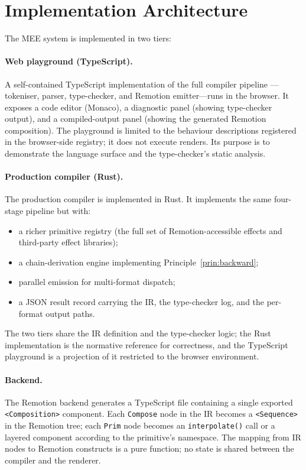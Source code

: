 \documentclass[twocolumn,11pt,a4paper]{article}
\theoremstyle{mee}
\theoremstyle{definition}
\theoremstyle{remark}
\begin{document}
\section{Implementation Architecture}
\label{sec:impl}

The MEE system is implemented in two tiers:

\paragraph{Web playground (TypeScript).}
A self-contained TypeScript implementation of the full compiler pipeline
---tokeniser, parser, type-checker, and Remotion emitter---runs in the
browser. It exposes a code editor (Monaco), a diagnostic panel (showing
type-checker output), and a compiled-output panel (showing the generated
Remotion composition). The playground is limited to the behaviour
descriptions registered in the browser-side registry; it does not execute
renders. Its purpose is to demonstrate the language surface and the
type-checker's static analysis.

\paragraph{Production compiler (Rust).}
The production compiler is implemented in Rust. It implements the same
four-stage pipeline but with:
\begin{itemize}[leftmargin=1.4em,itemsep=1pt]
\item a richer primitive registry (the full set of Remotion-accessible
  effects and third-party effect libraries);
\item a chain-derivation engine implementing
  Principle~\ref{prin:backward};
\item parallel emission for multi-format dispatch;
\item a JSON result record carrying the IR, the type-checker log, and
  the per-format output paths.
\end{itemize}

The two tiers share the IR definition and the type-checker logic; the
Rust implementation is the normative reference for correctness, and the
TypeScript playground is a projection of it restricted to the browser
environment.

\paragraph{Backend.}
The Remotion backend generates a TypeScript file containing a single
exported \texttt{<Composition>} component. Each \texttt{Compose} node in
the IR becomes a \texttt{<Sequence>} in the Remotion tree; each
\texttt{Prim} node becomes an \texttt{interpolate()} call or a layered
component according to the primitive's namespace. The mapping from IR
nodes to Remotion constructs is a pure function; no state is shared
between the compiler and the renderer.
\end{document}
